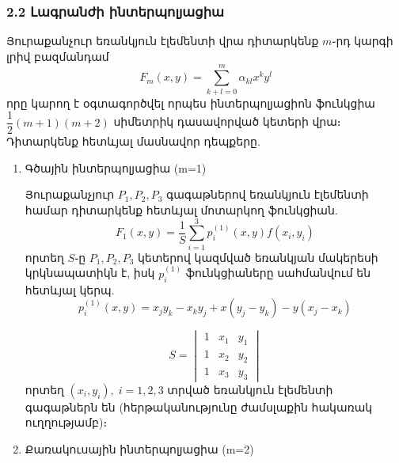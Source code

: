 \documentclass[fleqn, bachelor,subf,12pt,notitlepage]{article}
\begin{document}
\subsubsection*{2.2 Լագրանժի ինտերպոլյացիա}
Յուրաքանչուր եռանկյուն էլեմենտի վրա դիտարկենք $m$֊րդ կարգի լրիվ բազմանդամ
\begin{equation}
				F_{m}\left(x,y\right)=\sum_{k+l=0}^{m}\alpha_{kl}x^{k}y^{l}
\end{equation}
որը կարող է օգտագործվել որպես ինտերպոլյացիոն ֆունկցիա $\dfrac{1}{2}\left(m+1\right)\left(m+2\right)$ սիմետրիկ դասավորված կետերի վրա։
Դիտարկենք հետևյալ մասնավոր դեպքերը.
\begin{enumerate}
\item{Գծային ինտերպոլյացիա (m=1)}

Յուրաքանչյուր $P_{1}, P_{2}, P_{3}$ գագաթներով եռանկյուն էլեմենտի համար դիտարկենք հետևյալ մոտարկող ֆունկցիան.
\begin{equation}
F_{1}(x, y) = \dfrac{1}{S}\sum_{i=1}^{3} p^{(1)}_{i}(x,y)f(x_{i}, y_{i})
\end{equation}
որտեղ $S$֊ը $P_{1}, P_{2}, P_{3}$ կետերով կազմված եռանկյան մակերեսի կրկնապատիկն է, իսկ $p^{(1)}_{i}$ ֆունկցիաները սահմանվում են հետևյալ կերպ.
\begin{equation}
p^{(1)}_{i}(x,y) = x_{j}y_{k}-x_{k}y_{j}+x(y_{j}-y_{k})-y(x_{j}-x_{k})
\end{equation}

$$S = \begin{vmatrix}
     1 & x_1 & y_1\\ 
     1 & x_2 & y_2\\
     1 & x_3 & y_3 
\end{vmatrix}$$
որտեղ $(x_{i}, y_{i}), \; i=1, 2, 3$ տրված եռանկյուն էլեմենտի գագաթներն են (հերթականությունը ժամսլաքին հակառակ ուղղությամբ)։
\item{Քառակուսային ինտերպոլյացիա (m=2)}


\end{enumerate}
\end{document}

